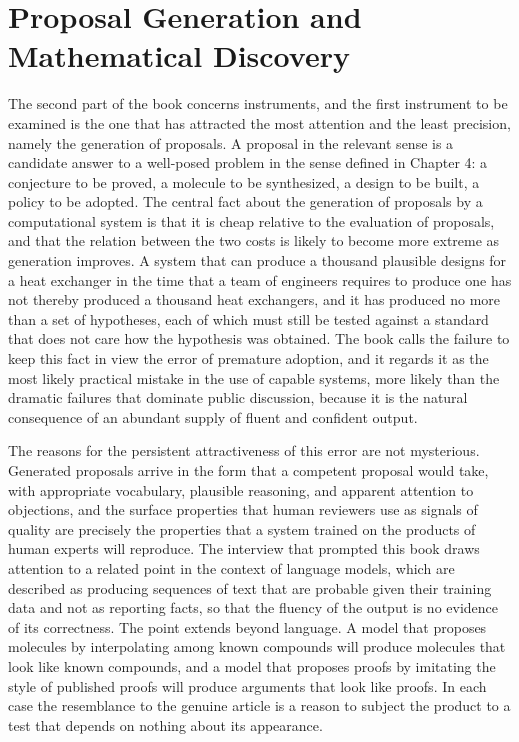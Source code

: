 \chapter{Proposal Generation and Mathematical Discovery}
\label{ch:06}

The second part of the book concerns instruments, and the first instrument to be examined is the one that has attracted the most attention and the least precision, namely the generation of proposals. A proposal in the relevant sense is a candidate answer to a well-posed problem in the sense defined in Chapter 4: a conjecture to be proved, a molecule to be synthesized, a design to be built, a policy to be adopted. The central fact about the generation of proposals by a computational system is that it is cheap relative to the evaluation of proposals, and that the relation between the two costs is likely to become more extreme as generation improves. A system that can produce a thousand plausible designs for a heat exchanger in the time that a team of engineers requires to produce one has not thereby produced a thousand heat exchangers, and it has produced no more than a set of hypotheses, each of which must still be tested against a standard that does not care how the hypothesis was obtained. The book calls the failure to keep this fact in view the error of premature adoption, and it regards it as the most likely practical mistake in the use of capable systems, more likely than the dramatic failures that dominate public discussion, because it is the natural consequence of an abundant supply of fluent and confident output.

The reasons for the persistent attractiveness of this error are not mysterious. Generated proposals arrive in the form that a competent proposal would take, with appropriate vocabulary, plausible reasoning, and apparent attention to objections, and the surface properties that human reviewers use as signals of quality are precisely the properties that a system trained on the products of human experts will reproduce. The interview that prompted this book draws attention to a related point in the context of language models, which are described as producing sequences of text that are probable given their training data and not as reporting facts, so that the fluency of the output is no evidence of its correctness. The point extends beyond language. A model that proposes molecules by interpolating among known compounds will produce molecules that look like known compounds, and a model that proposes proofs by imitating the style of published proofs will produce arguments that look like proofs. In each case the resemblance to the genuine article is a reason to subject the product to a test that depends on nothing about its appearance.

